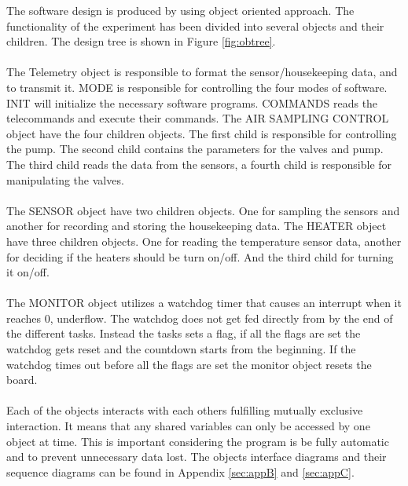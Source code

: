 \documentclass[a4paper,12pt,twoside]{article}
\begin{document}
\begin{enumerate}[label=(\alph*)]
The software design is produced by using object oriented approach. The functionality of the experiment has been divided into several objects and their children. The design tree is shown in Figure \ref{fig:obtree}.\\
\\
The Telemetry object is responsible to format the sensor/housekeeping data, and to transmit it. MODE is responsible for controlling the four modes of software. INIT will initialize the necessary software programs. COMMANDS reads the telecommands and execute their commands. The AIR SAMPLING CONTROL object have the four children objects. The first child is responsible for controlling the pump. The second child contains the parameters for the valves and pump. The third child reads the data from the sensors, a fourth child is responsible for manipulating the valves.\\
\\
The SENSOR object have two children objects. One for sampling the sensors and another for recording and storing the housekeeping data. The HEATER object have three children objects. One for reading the temperature sensor data, another for deciding if the heaters should be turn on/off. And the third child for turning it on/off.\\ 
\\
The MONITOR object utilizes a watchdog timer that causes an interrupt when it reaches 0, underflow. The watchdog does not get fed directly from by the end of the different tasks. Instead the tasks sets a flag, if all the flags are set the watchdog gets reset and the countdown starts from the beginning. If the watchdog times out before all the flags are set the monitor object resets the board.\\
\\
Each of the objects interacts with each others fulfilling mutually exclusive interaction. It means that any shared variables can only be accessed by one object at time. This is important considering the program is be fully automatic and to prevent unnecessary data lost. The objects interface diagrams and their sequence diagrams can be found in Appendix \ref{sec:appB} and \ref{sec:appC}.
\end{enumerate}
\end{document}
